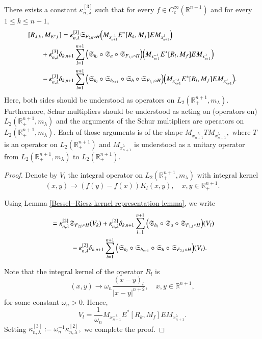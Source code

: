\documentclass[12pt]{amsart}
\begin{document}
\begin{proposition}\label{commutator representation lemma} There exists a constant $\kappa_{n,\lambda}^{[3]}$ such that for every $f\in C^{\infty}_c(\mathbb{R}^{n+1})$ and for every $1\leq k\leq n+1,$
\begin{align}\label{RHSofxxx}
[R_{\lambda,k},M_{E^{\ast}f}]&=\kappa_{n,\lambda}^{[3]}\mathfrak{S}_{F_{2,0}\circ H}\Big( M_{x_{n+1}^{-\lambda}} E^{\ast}[R_k,M_{f}]E M_{x_{n+1}^{\lambda}}\Big)\nonumber\\
&\hspace{-1.0cm}+\kappa_{n,\lambda}^{[3]}\delta_{k,n+1}\sum_{l=1}^{n+1}\Big(\mathfrak{S}_{h_l}\circ\mathfrak{S}_a\circ\mathfrak{S}_{F_{1,1}\circ H}\Big)\Big(M_{x_{n+1}^{-\lambda}} E^{\ast}[R_l,M_{f}]E M_{x_{n+1}^{\lambda}}\Big)\nonumber\\
&\hspace{-1.0cm}-\kappa_{n,\lambda}^{[3]}\delta_{k,n+1}\sum_{l=1}^{n+1}\Big(\mathfrak{S}_{h_l}\circ\mathfrak{S}_{h_{n+1}}\circ\mathfrak{S}_b\circ\mathfrak{S}_{F_{2,1}\circ H}\Big)\Big( M_{x_{n+1}^{-\lambda}} E^{\ast}[R_l,M_{f}]E M_{x_{n+1}^{\lambda}}\Big).
\end{align}
{\color{blue} Here, both sides should be understood as operators on $L_2(\mathbb{R}^{n+1}_+,m_{\lambda}).$ Furthermore, Schur multipliers should be understood as acting on (operators on) $L_2(\mathbb{R}^{n+1}_+,m_{\lambda})$ and the arguments of the Schur multipliers are operators on $L_2(\mathbb{R}^{n+1}_+,m_{\lambda}).$ Each of those arguments is of the shape $M_{x_{n+1}^{-\lambda}}TM_{x_{n+1}^{\lambda}},$ where $T$ is an operator on $L_2(\mathbb{R}^{n+1}_+)$ and $M_{x_{n+1}^{\lambda}}$ is understood as a unitary operator from $L_2(\mathbb{R}^{n+1}_+,m_{\lambda})$ to $L_2(\mathbb{R}^{n+1}_+).$ }
\end{proposition}
\begin{proof} Denote by $V_l$ the integral operator on $L_2(\mathbb{R}^{n+1}_+,m_{\lambda})$ with integral kernel
$$(x,y)\to (f(y)-f(x))K_l(x,y),\quad x,y\in\mathbb{R}_+^{n+1}.$$
{\color{blue} Using Lemma \ref{Bessel--Riesz kernel representation lemma}, we write
\begin{align}
[R_{\lambda,k},M_{E^{\ast}f}]&=\kappa_{n,\lambda}^{[2]}\mathfrak{S}_{F_{2,0}\circ H}(V_k)+\kappa_{n,\lambda}^{[2]}\delta_{k,n+1}\sum_{l=1}^{n+1}\Big(\mathfrak{S}_{h_l}\circ\mathfrak{S}_a\circ\mathfrak{S}_{F_{1,1}\circ H}\Big)(V_l)\nonumber\\
&\hspace{1.0cm}-\kappa_{n,\lambda}^{[2]}\delta_{k,n+1}\sum_{l=1}^{n+1}\Big(\mathfrak{S}_{h_l}\circ\mathfrak{S}_{h_{n+1}}\circ\mathfrak{S}_b\circ\mathfrak{S}_{F_{2,1}\circ H}\Big)(V_l)\nonumber.
\end{align}

Note that the integral kernel of the operator $R_l$ is
$$(x,y)\to\omega_n\frac{(x-y)_l}{|x-y|^{n+2}},\quad x,y\in\mathbb{R}^{n+1},$$
for some constant $\omega_{n}>0.$ Hence,
$$V_l=\frac1{\omega_n}M_{x_{n+1}^{-\lambda}} E^{\ast}[R_k,M_{f}]E M_{x_{n+1}^{\lambda}}.$$
Setting $\kappa_{n,\lambda}^{[3]}:=\omega_n^{-1}\kappa_{n,\lambda}^{[2]},$ we complete the proof.}
\end{proof}
\end{document}
